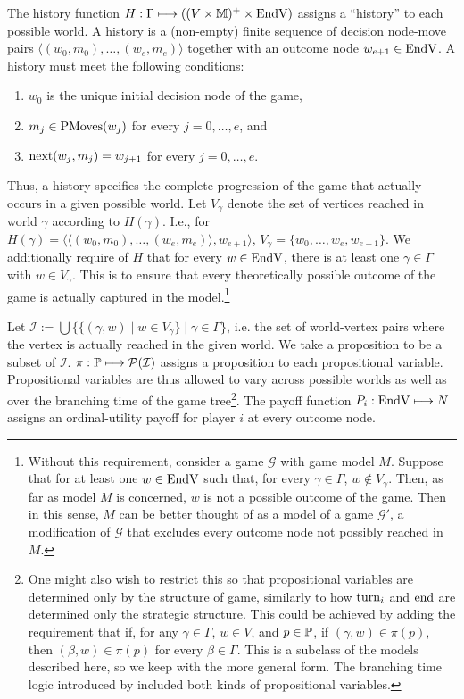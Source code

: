 \documentclass{article}
\let\cite\textcite
\begin{document}
The history function $H:\Gamma\longmapsto((V\times\mathbb{M})^+\times\text{EndV})$ assigns a ``history'' to each possible world. A history is a (non-empty) finite sequence of decision node-move pairs $\langle (w_0,m_0),\dots,(w_e,m_e)\rangle$ together with an outcome node $w_{e+1}\in\text{EndV}$. A history must meet the following conditions:
\begin{enumerate}
    \item $w_0$ is the unique initial decision node of the game,
    \item $m_j\in\text{PMoves}(w_j)$ for every $j=0,\dots,e$, and
    \item $\text{next}(w_j,m_j) = w_{j+1}$ for every $j=0,\dots,e$.
\end{enumerate}
Thus, a history specifies the complete progression of the game that actually occurs in a given possible world. Let $V_{\gamma}$ denote the set of vertices reached in world $\gamma$ according to $H(\gamma)$. I.e., for $H(\gamma) = \langle\langle(w_0,m_0),\dots,(w_e,m_e)\rangle,w_{e+1}\rangle$, $V_{\gamma}=\{w_0,\dots,w_e,w_{e+1}\}$. We additionally require of $H$ that for every $w\in\text{EndV}$, there is at least one $\gamma\in\Gamma$ with $w\in V_{\gamma}$. This is to ensure that every theoretically possible outcome of the game is actually captured in the model.\footnote{Without this requirement, consider a game $\mathcal G$ with game model $M$. Suppose that for at least one $w\in\text{EndV}$ such that, for every $\gamma\in\Gamma$, $w\notin V_{\gamma}$. Then, as far as model $M$ is concerned, $w$ is not a possible outcome of the game. Then in this sense, $M$ can be better thought of as a model of a game $\mathcal G'$, a modification of $\mathcal G$ that excludes every outcome node not possibly reached in $M$.}

Let $\mathcal I:=\bigcup\{\{(\gamma,w)\mid w\in V_{\gamma}\}\mid\gamma\in\Gamma\}$, i.e. the set of world-vertex pairs where the vertex is actually reached in the given world. We take a proposition to be a subset of $\mathcal I$. 
$\pi:\mathbb{P}\longmapsto\mathcal P(\mathcal I)$ assigns a proposition to each propositional variable. Propositional variables are thus allowed to vary across possible worlds as well as over the branching time of the game tree\footnote{One might also wish to restrict this so that propositional variables are determined only by the structure of game, similarly to how $\text{turn}_i$ and $\text{end}$ are determined only the strategic structure. This could be achieved by adding the requirement that if, for any $\gamma\in\Gamma$, $w\in V$, and $p\in\mathbb{P}$, if $(\gamma,w)\in\pi(p)$, then $(\beta,w)\in\pi(p)$ for every $\beta\in\Gamma$. This is a subclass of the models described here, so we keep with the more general form. The branching time logic introduced by \cite{Pri67} included both kinds of propositional variables.}. The payoff function $P_i:\text{EndV}\longmapsto N$ assigns an ordinal-utility payoff for player $i$ at every outcome node.
\end{document}
